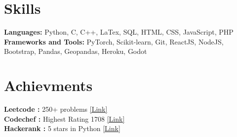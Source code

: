 \documentclass[]{Nikhil_Kadiyan_Resume}
\begin{document}
\section{Skills} 
\hrulefill

\pt \textbf{Languages:} Python, C, C++, LaTex, SQL, HTML, CSS, JavaScript, PHP \\
\pt \textbf{Frameworks and Tools:} PyTorch, Scikit-learn, Git, ReactJS, NodeJS, Bootstrap, Pandas, Geopandas, Heroku, Godot

\sectionsep

\section{Achievments} 
\hrulefill

\pt \textbf{Leetcode :} 250+ problems \href{https://leetcode.com/anidnottaken/}{[Link]} \\ 
\pt \textbf{Codechef :} Highest Rating 1708 \href{https://www.codechef.com/users/nikhilcad}{[Link]} \\ 
\pt \textbf{Hackerank :} 5 stars in Python \href{https://www.hackerrank.com/nikhilcaddilac?hr_r=1}{[Link]}\\

\sectionsep




\end{document}
